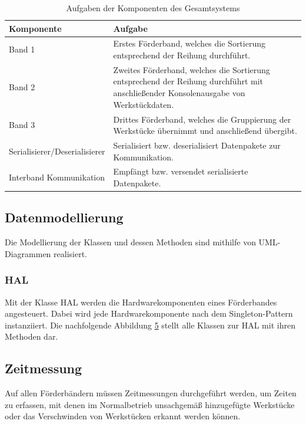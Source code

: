 \documentclass[a4paper, 11pt]{article}
\begin{document}
\begin{table}[H]
\center
    \begin{tabularx}{\textwidth}{|l|X|}
        \hline
        \textbf{Komponente}&\textbf{Aufgabe}\\
        \hline
        Band 1&Erstes Förderband, welches die Sortierung entsprechend der Reihung durchführt.\\
        \hline
        Band 2&Zweites Förderband, welches die Sortierung entsprechend der Reihung durchführt mit anschließender Konsolenausgabe von Werkstückdaten.\\
        \hline
        Band 3&Drittes Förderband, welches die Gruppierung der Werkstücke übernimmt und anschließend übergibt.\\
        \hline
        Serialisierer/Deserialisierer&Serialisiert bzw. deserialisiert Datenpakete zur Kommunikation.\\
        \hline
        Interband Kommunikation&Empfängt bzw. versendet serialisierte Datenpakete.\\
        \hline
        \end{tabularx}
    \caption{Aufgaben der Komponenten des Gesamtsystems}
    \label{archtotalcomp}
\end{table}


\subsection{Datenmodellierung}
Die Modellierung der Klassen und dessen Methoden sind mithilfe von UML-Diagrammen realisiert.
\subsubsection{HAL}
Mit der Klasse HAL werden die Hardwarekomponenten eines Förderbandes angesteuert. Dabei wird jede Hardwarekomponente nach dem Singleton-Pattern instanziiert. Die nachfolgende Abbildung \hyperref[sec:umlhal]{5} stellt alle Klassen zur HAL mit ihren Methoden dar.

\newpage

\label{sec:umlhal}
\newpage

\subsection{Zeitmessung}
Auf allen Förderbändern müssen Zeitmessungen durchgeführt werden, um Zeiten zu erfassen, mit denen im Normalbetrieb unsachgemäß hinzugefügte Werkstücke oder das Verschwinden von Werkstücken erkannt werden können.
\end{document}
